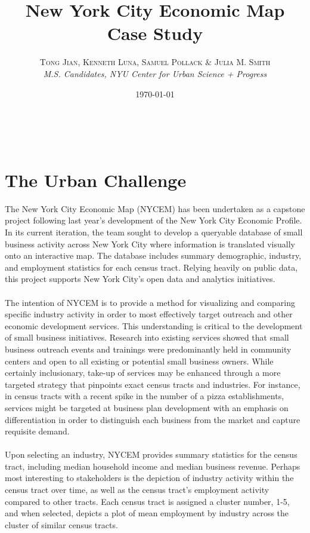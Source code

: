 \documentclass[11pt]{article} %
\title{\textbf{New York City Economic Map}\\ %
Case Study} %
\author{\textsc{Tong Jian, Kenneth Luna, Samuel Pollack \& Julia M. Smith} %
\\{\textit{M.S. Candidates, NYU Center for Urban Science + Progress}}} %
\date{\today} %
\makeatletter
\renewcommand{\maketitle}{ %
\begin{flushright} %
{\LARGE\@title} %

\vspace{50pt} %

{\large\@author} %
\\\@date %

\vspace{40pt} %
\end{flushright}
}
\makeatother
\begin{document}
\maketitle %


\section*{The Urban Challenge}

The New York City Economic Map (NYCEM) has been undertaken as a capstone project following last year's development of the New York City Economic Profile. In its current iteration, the team sought to develop a queryable database of small business activity across New York City where information is translated visually onto an interactive map. The database includes summary demographic, industry, and employment statistics for each census tract. Relying heavily on public data, this project supports New York City's open data and analytics initiatives.
\\\\
The intention of NYCEM is to provide a method for visualizing and comparing specific industry activity in order to most effectively target outreach and other economic development services. This understanding is critical to the development of small business initiatives. Research into existing services showed that small business outreach events and trainings were predominantly held in community centers and open to all existing or potential small business owners. While certainly inclusionary, take-up of services may be enhanced through a more targeted strategy that pinpoints exact census tracts and industries. For instance, in census tracts with a recent spike in the number of a pizza establishments, services might be targeted at business plan development with an emphasis on differentiation in order to distinguish each business from the market and capture requisite demand.
\\\\
Upon selecting an industry, NYCEM provides summary statistics for the census tract, including median household income and median business revenue. Perhaps most interesting to stakeholders is the depiction of industry activity within the census tract over time, as well as the census tract's employment activity compared to other tracts. Each census tract is assigned a cluster number, 1-5, and when selected, depicts a plot of mean employment by industry across the cluster of similar census tracts. 
\end{document}
